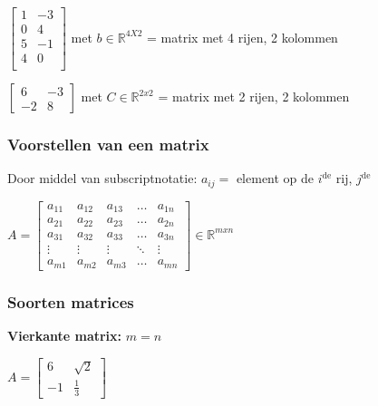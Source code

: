 \documentclass{article}
\begin{document}
\begin{center}
    $\begin{bmatrix}
        1 & -3\\
        0 & 4\\
        5 & -1\\
        4 & 0\\
    \end{bmatrix}$ met $b \in \mathbb{R}^{4X2}$ = matrix met 4 rijen, 2 kolommen
\end{center}

\begin{center}
    $\begin{bmatrix}
        6 & -3\\
        -2 & 8
    \end{bmatrix}$ met $C \in \mathbb{R}^{2x2}$ = matrix met 2 rijen, 2 kolommen        
\end{center}

\subsubsection{Voorstellen van een matrix}

Door middel van subscriptnotatie: $a_{ij} =$ element op de $i^\text{de}$ rij, $j^\text{de}$

\begin{center}
    $A = \begin{bmatrix}
        a_{11} & a_{12} & a_{13} & \dots & a_{1n}\\
        a_{21} & a_{22} & a_{23} & \dots & a_{2n}\\
        a_{31} & a_{32} & a_{33} & \dots & a_{3n}\\
        \vdots & \vdots & \vdots & \ddots & \vdots\\
        a_{m1} & a_{m2} & a_{m3} & \dots & a_{mn}
    \end{bmatrix} \in \mathbb{R}^{mxn}$
\end{center}


\subsubsection{Soorten matrices}

\textbf{Vierkante matrix:} $m = n$

\begin{center}
    $A = \begin{bmatrix}
        6 & \sqrt{2}\\
        -1 & \frac13
    \end{bmatrix}$
\end{center}
\end{document}
